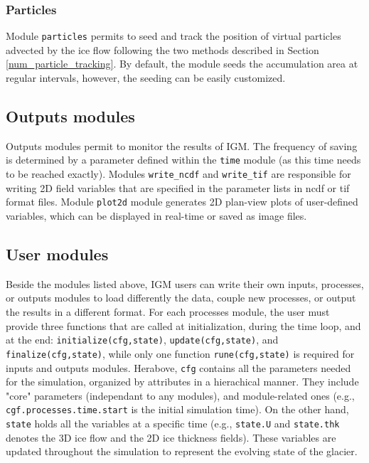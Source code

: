 \documentclass[gmd]{copernicus}
\begin{document}
\subsubsection{Particles}
\label{module_particles}

Module \texttt{particles} permits to seed and track the position of virtual particles advected by the ice flow following the two methods described in Section \ref{num_particle_tracking}. By default, the module seeds the accumulation area at regular intervals, however, the seeding can be easily customized.

\subsection{Outputs modules}

Outputs modules permit to monitor the results of IGM. The frequency of saving is determined by a parameter defined within the \texttt{time} module (as this time needs to be reached exactly). Modules \texttt{write\_ncdf} and \texttt{write\_tif} are responsible for writing 2D field variables that are specified in the parameter lists in ncdf or tif format files. Module \texttt{plot2d} module generates 2D plan-view plots of user-defined variables, which can be displayed in real-time or saved as image files. 

\subsection{User modules}
\label{user_modules}

Beside the modules listed above, IGM users can write their own inputs, processes, or outputs modules to load differently the data, couple new processes, or output the results in a different format. For each processes module, the user must provide three functions that are called at initialization, during the time loop, and at the end: \texttt{initialize(cfg,state)}, \texttt{update(cfg,state)}, and \texttt{finalize(cfg,state)}, while only one function \texttt{rune(cfg,state)} is required for inputs and outputs modules.  Herabove, \texttt{cfg} contains all the parameters needed for the simulation, organized by attributes in a hierachical manner. They include "core" parameters (independant to any modules), and module-related ones (e.g., \texttt{cgf.processes.time.start} is the initial simulation time). On the other hand, \texttt{state} holds all the variables at a specific time (e.g., \texttt{state.U} and \texttt{state.thk} denotes the 3D ice flow and the 2D ice thickness fields). These variables are updated throughout the simulation to represent the evolving state of the glacier.
\end{document}
